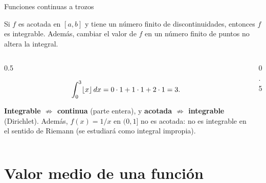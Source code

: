 \documentclass[10pt,aspectratio=169]{beamer}
\begin{document}
\begin{frame}{Funciones continuas a trozos}
  \begin{teorema}
    Si $f$ es acotada en $[a,b]$ y tiene un número finito de discontinuidades, entonces $f$ es integrable.
    Además, cambiar el valor de $f$ en un número finito de puntos no altera la integral.
  \end{teorema}
  \begin{columns}
    \begin{column}{0.5\textwidth}
      \begin{ejemplo}
        \[ \int_0^3\lfloor x\rfloor\,dx=0\cdot1+1\cdot1+2\cdot1=3. \]
      \end{ejemplo}
      \begin{observacion}
        \textbf{Integrable $\not\Rightarrow$ continua} (parte entera), y
        \textbf{acotada $\not\Rightarrow$ integrable} (Dirichlet).
        Además, $f(x)=1/x$ en $(0,1]$ no es acotada: \alert{no} es integrable en el sentido de Riemann
        (se estudiará como integral impropia).
      \end{observacion}
    \end{column}
    \begin{column}{0.5\textwidth}
      \centering
    \end{column}
  \end{columns}
\end{frame}

\section{Valor medio de una función}
\end{document}
